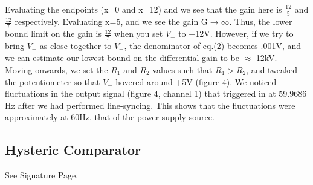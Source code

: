 \documentclass{article}
\begin{document}
    Evaluating the endpoints (x=0 and x=12) and we see that the gain here is $\frac{12}{5}$ and $\frac{12}{7}$ respectively. Evaluating x=5, and we see the gain G$\rightarrow \infty$. Thus, the lower bound limit on the gain is $\frac{12}{7}$ when you set $V_-$ to +12V. However, if we try to bring $V_+$ as close together to $V_-$, the denominator of eq.(2) becomes .001V, and we can estimate our lowest bound on the differential gain to be $\approx$ 12kV.
    \\\indent Moving onwards, we set the $R_1$ and $R_2$ values such that $R_1 > R_2$, and tweaked the potentiometer so that $V_-$ hovered around +5V (figure 4). We noticed fluctuations in the output signal (figure 4, channel 1) that triggered in at 59.9686 Hz after we had performed line-syncing. This shows that the fluctuations were approximately at 60Hz, that of the power supply source.
    
\subsection{Hysteric Comparator}
    See Signature Page.
\end{document}
